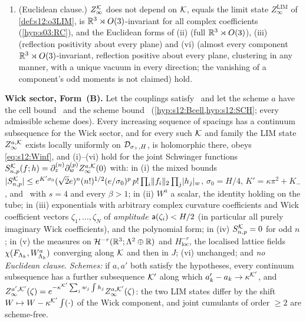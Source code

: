 \begin{theorem}
\begin{enumerate}[label=\textup{(\roman*)},leftmargin=*,nosep]
\item \textup{(Euclidean clause.)} $Z^{\mathcal K}_{\infty}$ does not depend on $\mathcal K$, equals the limit state $Z^{\mathrm{LIM}}_\infty$ of \cref{def:s12:o3LIM}, is $\mathbb R^3\rtimes O(3)$-invariant for all complex coefficients (\cref{hyp:s03:RC}), and the Euclidean forms of (ii) (full $\mathbb R^3\rtimes O(3)$), (iii) (reflection positivity about every plane) and (vi) (almost every component $\mathbb R^3\rtimes O(3)$-invariant, reflection positive about every plane, clustering in any manner, with a unique vacuum in every direction; the vanishing of a component's odd moments is not claimed) hold.
\end{enumerate}

\textbf{Wick sector, Form~(B).} Let the couplings satisfy \Tthree\ and let the scheme $a$ have the cell bound \Bcell\ and the scheme bound \SCH\ (\cref{hyp:s12:Bcell,hyp:s12:SCH}; every admissible scheme does). Every increasing sequence of spacings has a continuum subsequence for the Wick sector, and for every such $\mathcal K$ and family the LIM state $Z^{a,\mathcal K}_\infty$ exists locally uniformly on $\mathcal D_{\sigma_+,H}$, is holomorphic there, obeys \eqref{eq:s12:Winf}, and (i)--(vi) hold for the joint Schwinger functions $S^{\mathcal K}_{n,p}(f;h)=\partial^{(n)}_z\partial^{(p)}_wZ^{a,\mathcal K}_\infty(0)$ with: in (i) the mixed bounds $|S^{\mathcal K}_{n,p}|\le e^{K'\sigma_0}(\sqrt2e)^n(n!)^{1/2}(e/\sigma_0)^p\,p!\prod_i\lVert f_i\rVert_2\prod_j\lvert h_j\rvert_{w}$, $\sigma_0=H/4$, $K'=\kappa\pi^2+K_-$, and \Ezz\ with $s=4$ and every $\beta>1$; in (ii) $W^a$ a scalar, the identity holding on the tube; in (iii) exponentials with arbitrary complex curvature coefficients and Wick coefficient vectors $\zeta_1,\dots,\zeta_N$ of \emph{amplitude $\mathsf a(\zeta_i)<H/2$} (in particular all purely imaginary Wick coefficients), and the polynomial form; in (iv) $S^{\mathcal K}_{n,p}=0$ for odd $n$; in (v) the measures on $\mathcal H^{-r}(\mathbb R^3;\Lambda^2\oplus\mathbb R)$ and $H^{-r}_{\mathrm{loc}}$, the localised lattice fields $\chi(F_{\Lambda_k},W^a_{\Lambda_k})$ converging along $\mathcal K$ and then in $J$; (vi) unchanged; and \emph{no Euclidean clause}. \emph{Schemes:} if $a,a'$ both satisfy the hypotheses, every continuum subsequence has a further subsequence $\mathcal K'$ along which $a'_k-a_k\to\kappa^{\mathcal K'}$, and $Z^{a',\mathcal K'}_\infty(\zeta)=e^{-\kappa^{\mathcal K'}\sum_jw_j\int h_j}Z^{a,\mathcal K'}_\infty(\zeta)$: the two LIM states differ by the shift $W\mapsto W-\kappa^{\mathcal K'}\int(\cdot)$ of the Wick component, and joint cumulants of order $\ge2$ are scheme-free.
\end{theorem}

